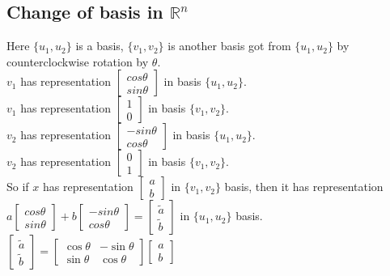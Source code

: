 \documentclass[twoside]{article}
\begin{document}
\subsection{Change of  basis in $\mathbb{R}^n$}
Here $\{u_1,u_2\}$ is a basis, $\{v_1,v_2\}$ is another basis got from $\{u_1,u_2\}$ by counterclockwise rotation by $\theta$.\\
$v_1$ has representation $ \begin{bmatrix}
           cos\theta \\
           sin\theta
         \end{bmatrix}$ 
in basis $\{u_1,u_2\}$.\\
$v_1$ has representation $ \begin{bmatrix}
           1 \\
           0
         \end{bmatrix}$ 
in basis $\{v_1,v_2\}$.\\
$v_2$ has representation $ \begin{bmatrix}
           -sin\theta \\
           cos\theta
         \end{bmatrix}$ 
in basis $\{u_1,u_2\}$.\\
$v_2$ has representation $ \begin{bmatrix}
           0 \\
           1
         \end{bmatrix}$ 
in basis $\{v_1,v_2\}$.\\
So if $x$ has representation $ \begin{bmatrix}
           a \\
           b
\end{bmatrix}$ in $\{v_1,v_2\}$ basis, then it has representation $a\begin{bmatrix}
           cos\theta \\
           sin\theta
\end{bmatrix}+b\begin{bmatrix}
           -sin\theta \\
           cos\theta
\end{bmatrix} = \begin{bmatrix}
           \widetilde{a}\\
           \widetilde{b}
\end{bmatrix} $ in $\{u_1,u_2\}$ basis.\\
$
\begin{bmatrix}
           \widetilde{a}\\
           \widetilde{b}
\end{bmatrix}=
\begin{bmatrix}
\cos\theta & -\sin\theta \\
\sin\theta & \cos\theta
\end{bmatrix}
\begin{bmatrix}
           a\\
           b
\end{bmatrix}$
\end{document}
